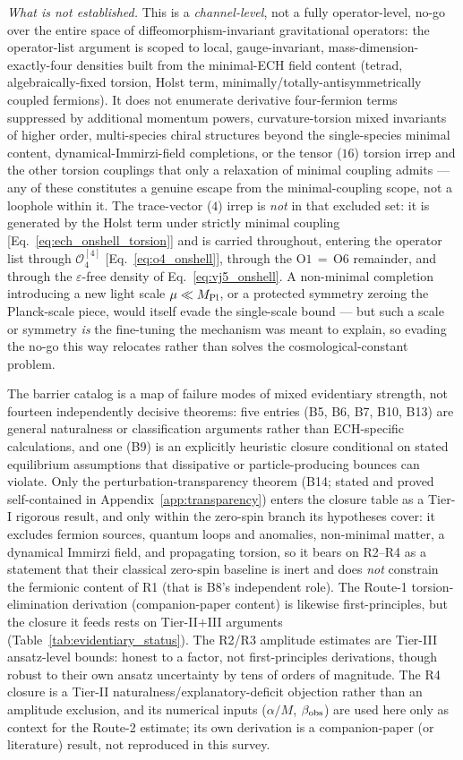 \documentclass[aps,prd,twocolumn,superscriptaddress,showpacs,preprintnumbers,nofootinbib,longbibliography,floatfix]{revtex4-2}
\newcommand{\MPl}{M_{\rm Pl}}
\begin{document}
\emph{What is not established.} This is a \emph{channel-level}, not a fully
operator-level, no-go over the entire space of diffeomorphism-invariant
gravitational operators: the operator-list argument is scoped to local,
gauge-invariant, mass-dimension-exactly-four densities built from the
minimal-ECH field content (tetrad, algebraically-fixed torsion, Holst term,
minimally/totally-antisymmetrically coupled fermions). It does not enumerate
derivative four-fermion terms suppressed by additional momentum powers,
curvature-torsion mixed invariants of higher order, multi-species chiral
structures beyond the single-species minimal content, dynamical-Immirzi-field
completions, or the tensor ($16$) torsion irrep and the other torsion
couplings that only a relaxation of minimal coupling admits --- any of these
constitutes a genuine escape from the minimal-coupling scope, not a loophole
within it. The trace-vector ($4$) irrep is \emph{not} in that excluded
set: it is generated by the Holst term under strictly minimal coupling
[Eq.~\eqref{eq:ech_onshell_torsion}] and is carried throughout, entering
the operator list through $\mathcal{O}_4^{[4]}$
[Eq.~\eqref{eq:o4_onshell}], through the
$\mathrm{O1}\,{=}\,\mathrm{O6}$ remainder, and through the
$\varepsilon$-free density of Eq.~\eqref{eq:vj5_onshell}. A non-minimal completion introducing a new light scale
$\mu\ll\MPl$, or a protected symmetry zeroing the Planck-scale piece, would
itself evade the single-scale bound --- but such a scale or symmetry \emph{is}
the fine-tuning the mechanism was meant to explain, so evading the no-go this
way relocates rather than solves the cosmological-constant problem.

The barrier catalog is a map of failure modes of mixed evidentiary strength,
not fourteen independently decisive theorems: five entries (B5, B6, B7, B10,
B13) are general naturalness or classification arguments rather than
ECH-specific calculations, and one (B9) is an explicitly heuristic closure
conditional on stated equilibrium assumptions that dissipative or
particle-producing bounces can violate. Only the perturbation-transparency
theorem (B14; stated and proved self-contained in
Appendix~\ref{app:transparency}) enters the closure table as a Tier-I
rigorous result, and only within the zero-spin branch its hypotheses
cover: it excludes fermion sources, quantum loops and anomalies,
non-minimal matter, a dynamical Immirzi field, and propagating torsion, so
it bears on R2--R4 as a statement that their classical zero-spin baseline
is inert and does \emph{not} constrain the fermionic content of R1
(that is B8's independent role). The Route-1 torsion-elimination
derivation (companion-paper content) is likewise first-principles, but
the closure it feeds rests on Tier-II$+$III arguments
(Table~\ref{tab:evidentiary_status}). The R2/R3 amplitude estimates are
Tier-III ansatz-level bounds: honest to a factor, not first-principles
derivations, though robust to their own ansatz uncertainty by tens of orders
of magnitude. The R4 closure is a Tier-II naturalness/explanatory-deficit
objection rather than an amplitude exclusion, and its numerical inputs
($\alpha/M$, $\beta_{\rm obs}$) are used here only as context for the Route-2
estimate; its own derivation is a companion-paper (or literature) result, not
reproduced in this survey.
\end{document}
